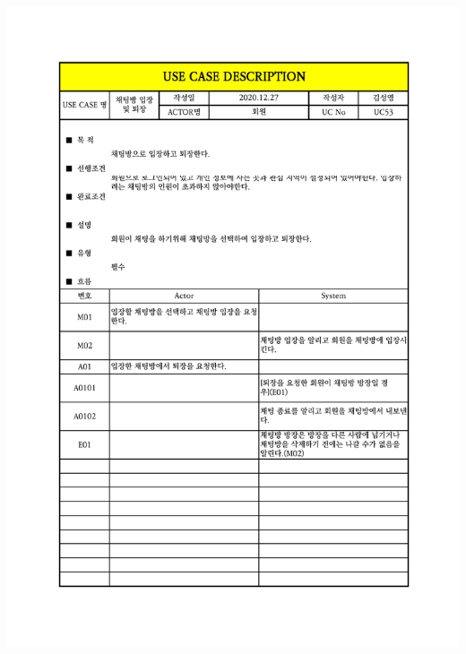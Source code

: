 {{{{{{{{{{{{{{{{{{{{{{{{{{{{{{{{{{{{{{{{{{{{{{{{{{{{{{{{\includegraphics[width=1.1\textwidth]{./Figure/Design/Display/usecase/053.pdf} \\
}}}}}}}}}}}}}}}}}}}}}}}}}}}}}}}}}}}}}}}}}}}}}}}}}}}}}}}}
